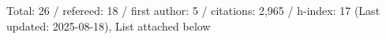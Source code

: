 Total: 26 / refereed: 18 / first author: 5 / citations: 2,965 / h-index: 17 (Last updated: 2025-08-18), List attached below